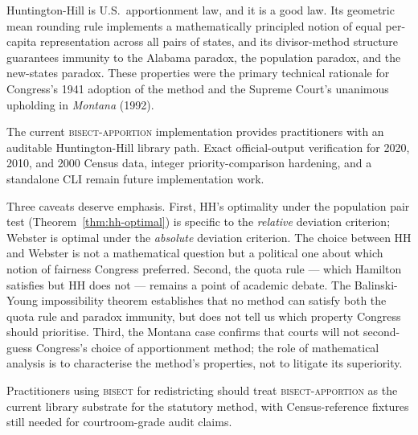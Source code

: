 Huntington-Hill is U.S.\ apportionment law, and it is a good law.
Its geometric mean rounding rule implements a mathematically principled
notion of equal per-capita representation across all pairs of states,
and its divisor-method structure guarantees immunity to the
Alabama paradox, the population paradox, and the new-states paradox.
These properties were the primary technical rationale for Congress's
1941 adoption of the method and the Supreme Court's unanimous
upholding in \textit{Montana} (1992).

The current \textsc{bisect-apportion} implementation provides practitioners
with an auditable Huntington-Hill library path.  Exact official-output
verification for 2020, 2010, and 2000 Census data, integer priority-comparison
hardening, and a standalone CLI remain future implementation work.

Three caveats deserve emphasis.
First, HH's optimality under the population pair test (Theorem~\ref{thm:hh-optimal})
is specific to the \emph{relative} deviation criterion;
Webster is optimal under the \emph{absolute} deviation criterion.
The choice between HH and Webster is not a mathematical question
but a political one about which notion of fairness Congress preferred.
Second, the quota rule --- which Hamilton satisfies but HH does not ---
remains a point of academic debate.
The Balinski-Young impossibility theorem establishes that no method can
satisfy both the quota rule and paradox immunity, but does not tell us
which property Congress should prioritise.
Third, the Montana case confirms that courts will not second-guess
Congress's choice of apportionment method; the role of mathematical
analysis is to characterise the method's properties, not to
litigate its superiority.

Practitioners using \textsc{bisect} for redistricting should treat
\textsc{bisect-apportion} as the current library substrate for the statutory
method, with Census-reference fixtures still needed for courtroom-grade audit
claims.
